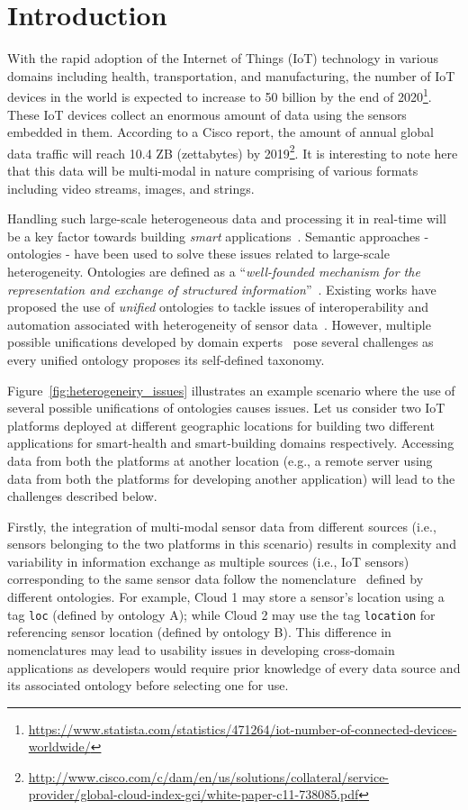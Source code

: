 \documentclass{elsart}  %
\begin{document}
\section{Introduction}
With the rapid adoption of the Internet of Things (IoT) technology in various domains including health, transportation, and manufacturing, the number of IoT devices in the world is expected to increase to 50 billion by the end of 2020\footnote{\url{https://www.statista.com/statistics/471264/iot-number-of-connected-devices-worldwide/}}. These IoT devices collect an enormous amount of data using the sensors embedded in them. According to a Cisco report, the amount of annual global data traffic will reach 10.4 ZB (zettabytes) by 2019\footnote{\url{http://www.cisco.com/c/dam/en/us/solutions/collateral/service-provider/global-cloud-index-gci/white-paper-c11-738085.pdf}}. It is interesting to note here that this data will be multi-modal in nature comprising of various formats including video streams, images, and strings. 

Handling such large-scale heterogeneous data and processing it in real-time will be a key factor towards building \emph{smart} applications~\cite{Aggarwal2013}. Semantic approaches - ontologies - have been used to solve these issues related to large-scale heterogeneity. Ontologies are defined as a ``\emph{well-founded mechanism for the representation and exchange of structured information}''~\cite{ye2007ontology}. Existing works have proposed the use of \emph{unified} ontologies to tackle issues of interoperability and automation associated with heterogeneity of sensor data~\cite{atzori2010internet,gyrard2014enrich,nambi2014unified}. However, multiple possible unifications developed by domain experts~\cite{gyrard2014domain} pose several challenges as every unified ontology proposes its self-defined taxonomy.

Figure~\ref{fig:heterogeneiry_issues} illustrates an example scenario where the use of several possible unifications of ontologies causes issues. Let us consider two IoT platforms deployed at different geographic locations for building two different applications for smart-health and smart-building domains respectively. Accessing data from both the platforms at another location (e.g., a remote server using data from both the platforms for developing another application) will lead to the challenges described below.

Firstly, the integration of multi-modal sensor data from different sources (i.e., sensors belonging to the two platforms in this scenario) results in complexity and variability in information exchange as multiple sources (i.e., IoT sensors) corresponding to the same sensor data follow the nomenclature~\cite{ye2007ontology} defined by different ontologies. For example, Cloud 1 may store a sensor's location using a tag \texttt{loc} (defined by ontology A); while Cloud 2 may use the tag \texttt{location} for referencing sensor location (defined by ontology B). This difference in nomenclatures may lead to usability issues in developing cross-domain applications as developers would require prior knowledge of every data source and its associated ontology before selecting one for use.
\end{document}
